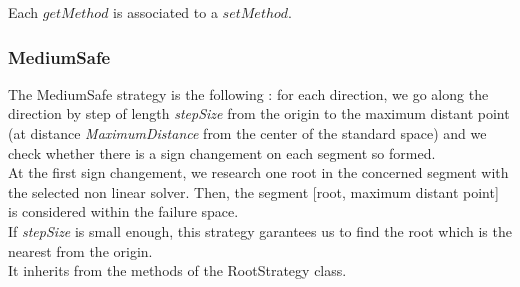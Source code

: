 \begin{description}
  Each $getMethod$  is associated to a $setMethod$.

\end{description}

\newpage \subsubsection{MediumSafe}

The MediumSafe strategy is the following : for each direction, we go along the direction by step of length {\itshape stepSize} from the origin to the maximum distant point (at distance {\itshape MaximumDistance} from the center of the standard space) and we check whether there is a sign changement on each segment so formed.\\
At the first sign changement, we research one root in the concerned segment with the selected non linear solver. Then, the segment [root, maximum distant point] is considered within the failure space. \\
If {\itshape stepSize} is small enough, this strategy garantees us to find the root which is the nearest from the origin.\\

It inherits from the methods of the RootStrategy class.


